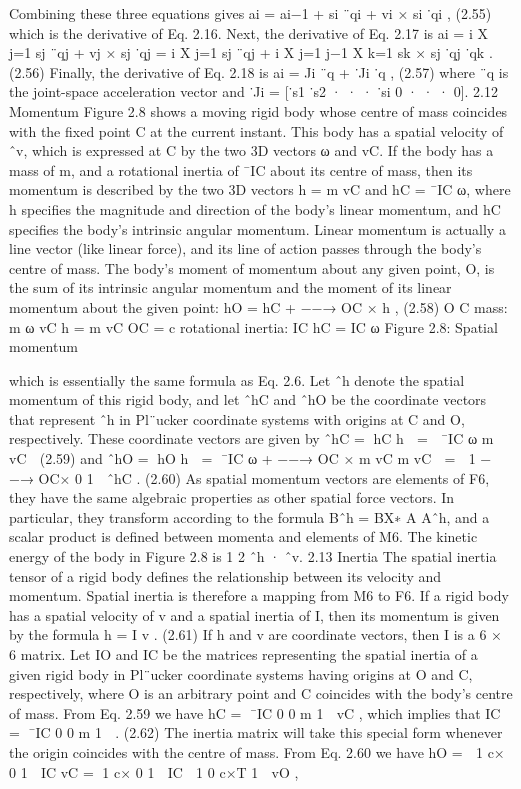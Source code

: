 Combining these three equations gives ai = ai−1 + si ¨qi + vi × si ˙qi , (2.55) which is the derivative of Eq. 2.16. Next, the derivative of Eq. 2.17 is ai = i X j=1 sj ¨qj + vj × sj ˙qj = i X j=1 sj ¨qj + i X j=1 j−1 X k=1 sk × sj ˙qj ˙qk . (2.56) Finally, the derivative of Eq. 2.18 is ai = Ji ¨q + ˙Ji ˙q , (2.57) where ¨q is the joint-space acceleration vector and ˙Ji = [˙s1 ˙s2 · · · ˙si 0 · · · 0]. 2.12 Momentum Figure 2.8 shows a moving rigid body whose centre of mass coincides with the fixed point C at the current instant. This body has a spatial velocity of ˆv, which is expressed at C by the two 3D vectors ω and vC. If the body has a mass of m, and a rotational inertia of ¯IC about its centre of mass, then its momentum is described by the two 3D vectors h = m vC and hC = ¯IC ω, where h specifies the magnitude and direction of the body’s linear momentum, and hC specifies the body’s intrinsic angular momentum. Linear momentum is actually a line vector (like linear force), and its line of action passes through the body’s centre of mass. The body’s moment of momentum about any given point, O, is the sum of its intrinsic angular momentum and the moment of its linear momentum about the given point: hO = hC + −−→ OC × h , (2.58) O C mass: m ω vC h = m vC OC = c rotational inertia: IC hC = IC ω Figure 2.8: Spatial momentum

which is essentially the same formula as Eq. 2.6. Let ˆh denote the spatial momentum of this rigid body, and let ˆhC and ˆhO be the coordinate vectors that represent ˆh in Pl¨ucker coordinate systems with origins at C and O, respectively. These coordinate vectors are given by ˆhC = hC h  =  ¯IC ω m vC  (2.59) and ˆhO = hO h  = ¯IC ω + −−→ OC × m vC m vC  =  1 −−→ OC× 0 1  ˆhC . (2.60) As spatial momentum vectors are elements of F6, they have the same algebraic properties as other spatial force vectors. In particular, they transform according to the formula Bˆh = BX∗ A Aˆh, and a scalar product is defined between momenta and elements of M6. The kinetic energy of the body in Figure 2.8 is 1 2 ˆh · ˆv. 2.13 Inertia The spatial inertia tensor of a rigid body defines the relationship between its velocity and momentum. Spatial inertia is therefore a mapping from M6 to F6. If a rigid body has a spatial velocity of v and a spatial inertia of I, then its momentum is given by the formula h = I v . (2.61) If h and v are coordinate vectors, then I is a 6 × 6 matrix. Let IO and IC be the matrices representing the spatial inertia of a given rigid body in Pl¨ucker coordinate systems having origins at O and C, respectively, where O is an arbitrary point and C coincides with the body’s centre of mass. From Eq. 2.59 we have hC = ¯IC 0 0 m 1  vC , which implies that IC = ¯IC 0 0 m 1  . (2.62) The inertia matrix will take this special form whenever the origin coincides with the centre of mass. From Eq. 2.60 we have hO =  1 c× 0 1  IC vC = 1 c× 0 1  IC  1 0 c×T 1  vO ,

